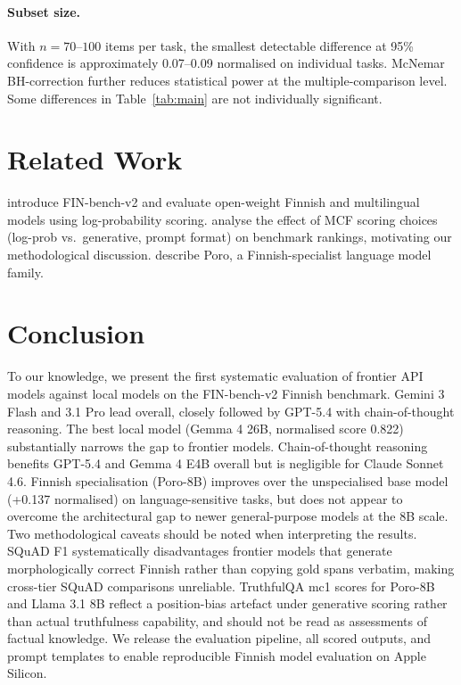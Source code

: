 \documentclass[11pt]{article}
\begin{document}
\paragraph{Subset size.}
With $n = 70$--$100$ items per task, the smallest detectable difference
at 95\% confidence is approximately 0.07--0.09 normalised on individual tasks.
McNemar BH-correction further reduces statistical power at the multiple-comparison
level.
Some differences in Table~\ref{tab:main} are not individually significant.

\section{Related Work}

\citet{kytoniemi2025} introduce FIN-bench-v2 and evaluate open-weight
Finnish and multilingual models using log-probability scoring.
\citet{gu2025olmes} analyse the effect of MCF scoring choices
(log-prob vs.\ generative, prompt format) on benchmark rankings,
motivating our methodological discussion.
\citet{luukkonen2023fingpt} describe Poro, a Finnish-specialist
language model family.

\section{Conclusion}

To our knowledge, we present the first systematic evaluation of frontier
API models against local models on the FIN-bench-v2 Finnish benchmark.
Gemini 3 Flash and 3.1 Pro lead overall, closely followed by GPT-5.4 with
chain-of-thought reasoning.
The best local model (Gemma 4 26B, normalised score 0.822) substantially
narrows the gap to frontier models.
Chain-of-thought reasoning benefits GPT-5.4 and Gemma 4 E4B overall but
is negligible for Claude Sonnet 4.6.
Finnish specialisation (Poro-8B) improves over the unspecialised base model
(+0.137 normalised) on language-sensitive tasks, but does not appear to
overcome the architectural gap to newer general-purpose models at the 8B scale.
Two methodological caveats should be noted when interpreting the results.
SQuAD F1 systematically disadvantages frontier models that generate
morphologically correct Finnish rather than copying gold spans verbatim,
making cross-tier SQuAD comparisons unreliable.
TruthfulQA mc1 scores for Poro-8B and Llama 3.1 8B reflect a position-bias
artefact under generative scoring rather than actual truthfulness capability,
and should not be read as assessments of factual knowledge.
We release the evaluation pipeline, all scored outputs, and prompt templates
to enable reproducible Finnish model evaluation on Apple Silicon.
\end{document}

